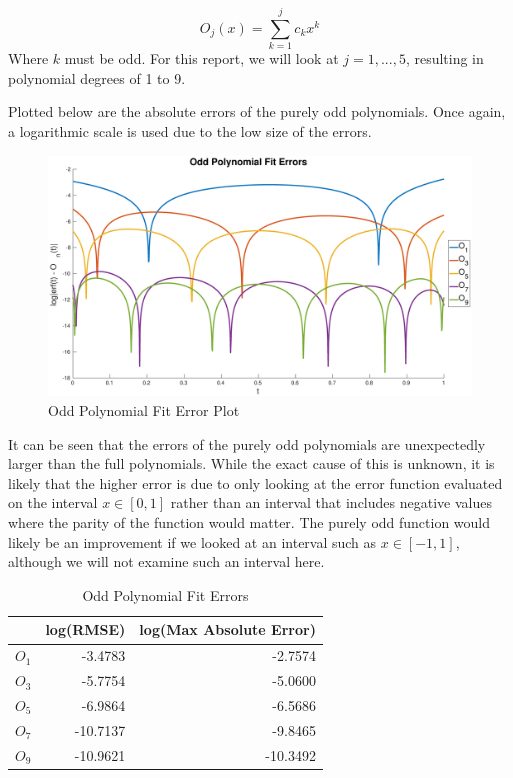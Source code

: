 \documentclass[10pt,a4paper]{article}
\begin{document}
\begin{equation}
O_j(x) = \sum\limits_{k=1}^j c_k x^k
\label{eqn: odd polynomial}
\end{equation}
Where $k$ must be odd. For this report, we will look at $j = 1, ..., 5$, resulting in polynomial degrees of 1 to 9.

Plotted below are the absolute errors of the purely odd polynomials. Once again, a logarithmic scale is used due to the low size of the errors.

\begin{figure}[H]
\includegraphics[width=\linewidth]{Figures/oddpolyerror.eps}
\caption{Odd Polynomial Fit Error Plot}
\label{fig: odderror}
\end{figure}

It can be seen that the errors of the purely odd polynomials are unexpectedly larger than the full polynomials. While the exact cause of this is unknown, it is likely that the higher error is due to only looking at the error function evaluated on the interval $x \in [0,1]$ rather than an interval that includes negative values where the parity of the function would matter. The purely odd function would likely be an improvement if we looked at an interval such as $x \in [-1,1]$, although we will not examine such an interval here.

\begin{table}[H]
\centering
\begin{tabular}{l|rr}
     & \multicolumn{1}{c}{log(RMSE)} & \multicolumn{1}{c}{log(Max Absolute Error)} \\ \hline
$O_1$ & -3.4783             & -2.7574                           \\
$O_3$ & -5.7754            & -5.0600                           \\
$O_5$ & -6.9864           & -6.5686                           \\
$O_7$ & -10.7137           & -9.8465                          \\
$O_9$ & -10.9621             & -10.3492                          
\end{tabular}
\caption{Odd Polynomial Fit Errors}
\label{table: odderrors}
\end{table}
\end{document}
